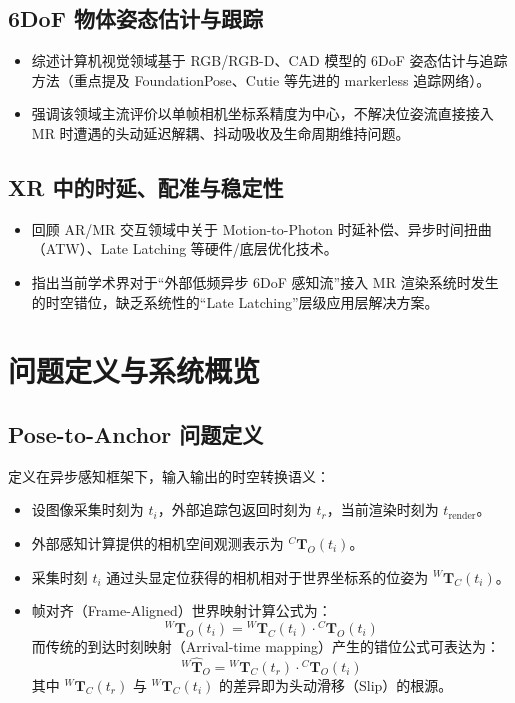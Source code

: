 \documentclass[review]{vgtc}
\begin{document}
\subsection{6DoF 物体姿态估计与跟踪}
\begin{itemize}
  \item 综述计算机视觉领域基于 RGB/RGB-D、CAD 模型的 6DoF 姿态估计与追踪方法（重点提及 FoundationPose、Cutie 等先进的 markerless 追踪网络）。
  \item 强调该领域主流评价以单帧相机坐标系精度为中心，不解决位姿流直接接入 MR 时遭遇的头动延迟解耦、抖动吸收及生命周期维持问题。
\nobreak
\end{itemize}

\subsection{XR 中的时延、配准与稳定性}
\begin{itemize}
  \item 回顾 AR/MR 交互领域中关于 Motion-to-Photon 时延补偿、异步时间扭曲（ATW）、Late Latching 等硬件/底层优化技术。
  \item 指出当前学术界对于“外部低频异步 6DoF 感知流”接入 MR 渲染系统时发生的时空错位，缺乏系统性的“Late Latching”层级应用层解决方案。
\end{itemize}

\section{问题定义与系统概览}

\subsection{Pose-to-Anchor 问题定义}
定义在异步感知框架下，输入输出的时空转换语义：
\begin{itemize}
  \item 设图像采集时刻为 $t_i$，外部追踪包返回时刻为 $t_r$，当前渲染时刻为 $t_{\text{render}}$。
  \item 外部感知计算提供的相机空间观测表示为 ${}^{C}\mathbf{T}_{O}(t_i)$。
  \item 采集时刻 $t_i$ 通过头显定位获得的相机相对于世界坐标系的位姿为 ${}^{W}\mathbf{T}_{C}(t_i)$。
  \item 帧对齐（Frame-Aligned）世界映射计算公式为：
  \[
  {}^{W}\mathbf{T}_{O}(t_i) = {}^{W}\mathbf{T}_{C}(t_i) \cdot {}^{C}\mathbf{T}_{O}(t_i)
  \]
  而传统的到达时刻映射（Arrival-time mapping）产生的错位公式可表达为：
  \[
  {}^{W}\hat{\mathbf{T}}_{O} = {}^{W}\mathbf{T}_{C}(t_r) \cdot {}^{C}\mathbf{T}_{O}(t_i)
  \]
  其中 ${}^{W}\mathbf{T}_{C}(t_r)$ 与 ${}^{W}\mathbf{T}_{C}(t_i)$ 的差异即为头动滑移（Slip）的根源。
\end{itemize}
\end{document}
